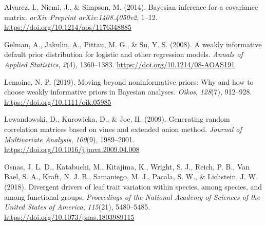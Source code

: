 \documentclass[
  12pt,
  letterpaper,
  DIV=11,
  numbers=noendperiod]{scrartcl}
\newlength{\cslhangindent}
\newlength{\cslentryspacingunit} %
\newenvironment{CSLReferences}[2] %
 {%
  \setlength{\parindent}{0pt}
  \ifodd #1
  \let\oldpar\par
  \def\par{\hangindent=\cslhangindent\oldpar}
  \fi
  \setlength{\parskip}{#2\cslentryspacingunit}
 }%
 {}
\begin{document}
\hypertarget{refs}{}
\begin{CSLReferences}{1}{0}
\leavevmode{}%
Alvarez, I., Niemi, J., \& Simpson, M. (2014). Bayesian inference for a
covariance matrix. \emph{arXiv Preprint arXiv:1408.4050v2}, 1--12.
\url{https://doi.org/10.1214/aos/1176348885}

\leavevmode{}%
Gelman, A., Jakulin, A., Pittau, M. G., \& Su, Y. S. (2008). A weakly
informative default prior distribution for logistic and other regression
models. \emph{Annals of Applied Statistics}, \emph{2}(4), 1360--1383.
\url{https://doi.org/10.1214/08-AOAS191}

\leavevmode{}%
Lemoine, N. P. (2019). Moving beyond noninformative priors: Why and how
to choose weakly informative priors in {Bayesian} analyses.
\emph{Oikos}, \emph{128}(7), 912--928.
\url{https://doi.org/10.1111/oik.05985}

\leavevmode{}%
Lewandowski, D., Kurowicka, D., \& Joe, H. (2009). Generating random
correlation matrices based on vines and extended onion method.
\emph{Journal of Multivariate Analysis}, \emph{100}(9), 1989--2001.
\url{https://doi.org/10.1016/j.jmva.2009.04.008}

\leavevmode{}%
Osnas, J. L. D., Katabuchi, M., Kitajima, K., Wright, S. J., Reich, P.
B., Van Bael, S. A., Kraft, N. J. B., Samaniego, M. J., Pacala, S. W.,
\& Lichstein, J. W. (2018). Divergent drivers of leaf trait variation
within species, among species, and among functional groups.
\emph{Proceedings of the National Academy of Sciences of the United
States of America}, \emph{115}(21), 5480--5485.
\url{https://doi.org/10.1073/pnas.1803989115}

\end{CSLReferences}
\end{document}
